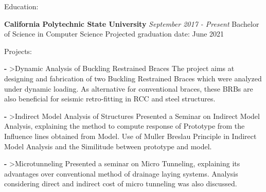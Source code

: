 \documentclass{resume3}%
\begin{document}
%
\normalsize%
\begin{flushleft}%
\newcommand{\EducationEntry}[1]{
                            {\bf\italic California Polytechnic State University\linebreak }
                            {\em September {#1} - Present}
                        }%
\newcommand{\BoldHeading}[1]{
                            {\bf{#1}}
                        }%
\newcommand{\DatedEntry}[2]{
                            \bf\item\fbox{#1} 
                            ->
                            {\bf\em{#2}}
                        }%
\newcommand{\FirstDatedEntry}[2]{
                            \bf\text\fbox{#1} 
                            ->
                            {\bf\em{#2}}
                        }%
\begin{rSection}{Education:}%
\EducationEntry{2017}%
\linebreak%
Bachelor of Science in Computer Science%
\linebreak%
Projected graduation date: June 2021%
\end{rSection}%
\begin{rSection}{Projects:}%
\BoldHeading->{Dynamic Analysis of Buckling Restrained Braces}%
\linebreak%
\linebreak%
The project aims at designing and fabrication of two Buckling Restrained Braces which were analyzed under dynamic loading. As alternative for conventional braces, these BRBs are also beneficial for seismic retro{-}fitting in RCC and steel structures.%
\linebreak%
\linebreak%
\BoldHeading->{Indirect Model Analysis of Structures}%
\linebreak%
\linebreak%
Presented a Seminar on Indirect Model Analysis, explaining the method to compute response of Prototype from the Influence lines obtained from Model. Use of Muller Breslau Principle in Indirect Model Analysis and the Similitude between prototype and  model.%
\linebreak%
\linebreak%
\BoldHeading->{Microtunneling}%
\linebreak%
\linebreak%
Presented a seminar on Micro Tunneling, explaining its advantages over conventional method of drainage laying systems. Analysis considering direct and indirect cost of micro tunneling was also discussed.%

\end{rSection}
\end{flushleft}
\end{document}
